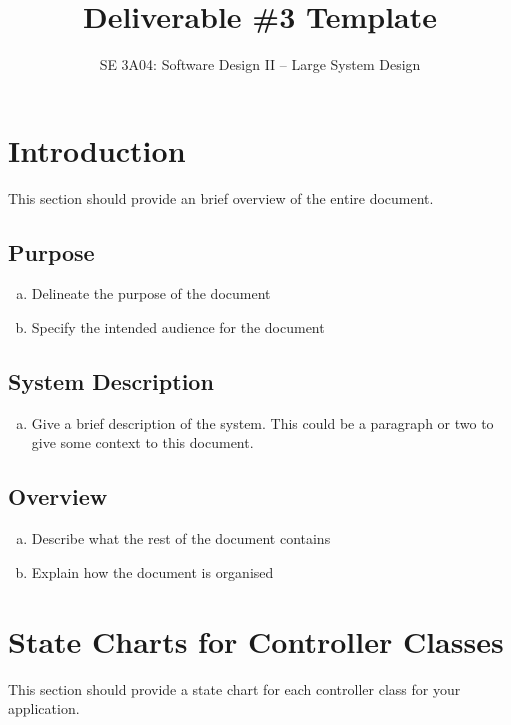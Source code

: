\documentclass[]{article}
\title{Deliverable \#3 Template}
\author{SE 3A04: Software Design II -- Large System Design}
\date{}
\begin{document}
\maketitle	

\section{Introduction}
\label{sec:introduction}

This section should provide an brief overview of the entire document.

\subsection{Purpose}
\label{sub:purpose}
\begin{enumerate}[a)]
	\item Delineate the purpose of the document
	\item Specify the intended audience for the document
\end{enumerate}

\subsection{System Description}
\label{sub:system_description}
\begin{enumerate}[a)]
	\item Give a brief description of the system. This could be a paragraph or two to give some context to this document.
\end{enumerate}

\subsection{Overview}
\label{sub:overview}
\begin{enumerate}[a)]
	\item Describe what the rest of the document contains 
	\item Explain how the document is organised
\end{enumerate}



\section{State Charts for Controller Classes}
\label{sec:state_charts_for_controller_classes}
This section should provide a state chart for each controller class for your application.
\end{document}
